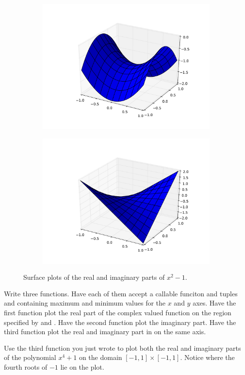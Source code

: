 \begin{figure}
\begin{subfigure}{.49\textwidth}
\includegraphics[width=\textwidth]{poly_surface_plot_real}
\end{subfigure}
\begin{subfigure}{.49\textwidth}
\includegraphics[width=\textwidth]{poly_surface_plot_imag}
\end{subfigure}
\caption{Surface plots of the real and imaginary parts of $x^2 - 1$.}
\label{fig:poly_surface_plot}
\end{figure}

\begin{problem}
Write three functions.
Have each of them accept a callable funciton  and tuples  and  containing maximum and minimum values for the $x$ and $y$ axes.
Have the first function plot the real part of the complex valued function  on the region specified by  and .
Have the second function plot the imaginary part.
Have the third function plot the real and imaginary part in on the same axis.

Use the third function you just wrote to plot both the real and imaginary parts of the polynomial $x^4 + 1$ on the domain $\left[-1, 1\right] \times \left[-1, 1\right]$.
Notice where the fourth roots of $-1$ lie on the plot.
\end{problem}

